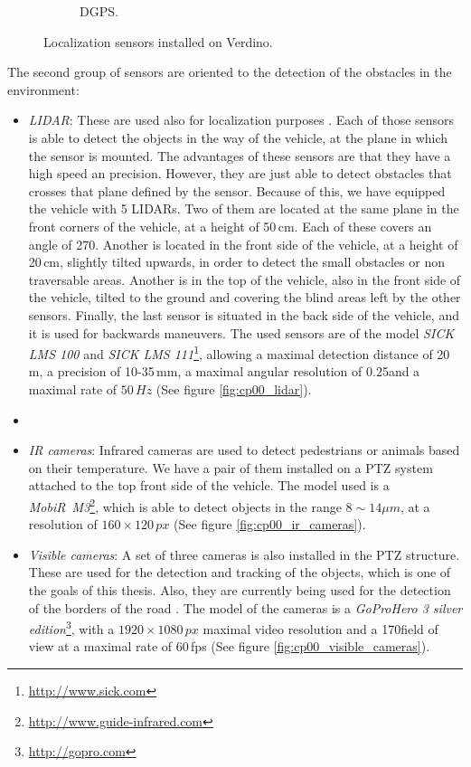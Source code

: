 \begin{figure}[h!]
\begin{subfigure}[b]{0.32\textwidth}
                \caption{\ac{DGPS}.}\label{fig:cp00_dgps}
        \end{subfigure}%
        \caption{Localization sensors installed on Verdino.}\label{fig:cp00_actuators}
\end{figure}

The second group of sensors are oriented to the detection of the obstacles in the environment:

\begin{itemize}
 \item \emph{\acf{LIDAR}}: These are used also for localization purposes \citep{Perea2013mcl}. Each of those sensors is able to detect the objects in the way of the vehicle, at the plane in which the sensor is mounted. The advantages of these sensors are that they have a high speed an precision. However, they are just able to detect obstacles that crosses that plane defined by the sensor. Because of this, we have equipped the vehicle with 5 \acp{LIDAR}. Two of them are located at the same plane in the front corners of the vehicle, at a height of 50\,cm. Each of these covers an angle of 270\textdegree. Another is located in the front side of the vehicle, at a height of 20\,cm, slightly tilted upwards, in order to detect the small obstacles or non traversable areas. Another is in the top of the vehicle, also in the front side of the vehicle, tilted to the ground and covering the blind areas left by the other sensors. Finally, the last sensor is situated in the back side of the vehicle, and it is used for backwards maneuvers. The used sensors are of the model \emph{SICK LMS 100} and \emph{SICK LMS 111}\footnote{\url{http://www.sick.com}}, allowing a maximal detection distance of 20\,m, a precision of 10-35\,mm, a maximal angular resolution of 0.25\textdegree and a maximal rate of $50\,Hz$ (See figure \ref{fig:cp00_lidar}).
 \item {}
 \item \emph{IR cameras}: Infrared cameras are used to detect pedestrians or animals based on their temperature. We have a pair of them installed on a \ac{PTZ} system attached to the top front side of the vehicle. The model used is a \emph{MobiR\textregistered~M3}\footnote{\url{http://www.guide-infrared.com}}, which is able to detect objects in the range $8\sim14\mu m$, at a resolution of $160 \times 120\,px$ (See figure \ref{fig:cp00_ir_cameras}).
 \item \emph{Visible cameras}: A set of three cameras is also installed in the \ac{PTZ} structure. These are used for the detection and tracking of the objects, which is one of the goals of this thesis. Also, they are currently being used for the detection of the borders of the road \citep{arnay2009applying}. The model of the cameras is a \emph{GoPro\textregistered Hero 3 silver edition}\footnote{\url{http://gopro.com}}, with a $1920 \times 1080 \, px$ maximal video resolution and a 170\textdegree field of view at a maximal rate of 60\,fps (See figure \ref{fig:cp00_visible_cameras}).
\end{itemize}

